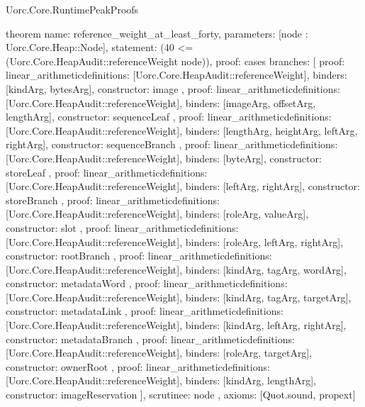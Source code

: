 \begin{lexlean}{Uorc.Core.RuntimePeakProofs}
\begin{semanticmodule}
theorem{
  name: reference_weight_at_least_forty,
  parameters: [node : Uorc.Core.Heap::Node],
  statement: (40 <= (Uorc.Core.HeapAudit::referenceWeight node)),
  proof: cases{
    branches: [
      {
        proof: linear_arithmetic{definitions: [Uorc.Core.HeapAudit::referenceWeight]},
        binders: [kindArg, bytesArg],
        constructor: image
      },
      {
        proof: linear_arithmetic{definitions: [Uorc.Core.HeapAudit::referenceWeight]},
        binders: [imageArg, offsetArg, lengthArg],
        constructor: sequenceLeaf
      },
      {
        proof: linear_arithmetic{definitions: [Uorc.Core.HeapAudit::referenceWeight]},
        binders: [lengthArg, heightArg, leftArg, rightArg],
        constructor: sequenceBranch
      },
      {
        proof: linear_arithmetic{definitions: [Uorc.Core.HeapAudit::referenceWeight]},
        binders: [byteArg],
        constructor: storeLeaf
      },
      {
        proof: linear_arithmetic{definitions: [Uorc.Core.HeapAudit::referenceWeight]},
        binders: [leftArg, rightArg],
        constructor: storeBranch
      },
      {
        proof: linear_arithmetic{definitions: [Uorc.Core.HeapAudit::referenceWeight]},
        binders: [roleArg, valueArg],
        constructor: slot
      },
      {
        proof: linear_arithmetic{definitions: [Uorc.Core.HeapAudit::referenceWeight]},
        binders: [roleArg, leftArg, rightArg],
        constructor: rootBranch
      },
      {
        proof: linear_arithmetic{definitions: [Uorc.Core.HeapAudit::referenceWeight]},
        binders: [kindArg, tagArg, wordArg],
        constructor: metadataWord
      },
      {
        proof: linear_arithmetic{definitions: [Uorc.Core.HeapAudit::referenceWeight]},
        binders: [kindArg, tagArg, targetArg],
        constructor: metadataLink
      },
      {
        proof: linear_arithmetic{definitions: [Uorc.Core.HeapAudit::referenceWeight]},
        binders: [kindArg, leftArg, rightArg],
        constructor: metadataBranch
      },
      {
        proof: linear_arithmetic{definitions: [Uorc.Core.HeapAudit::referenceWeight]},
        binders: [roleArg, targetArg],
        constructor: ownerRoot
      },
      {
        proof: linear_arithmetic{definitions: [Uorc.Core.HeapAudit::referenceWeight]},
        binders: [kindArg, lengthArg],
        constructor: imageReservation
      }
    ],
    scrutinee: node
  },
  axioms: [Quot.sound, propext]
}


\end{semanticmodule}
\end{lexlean}
